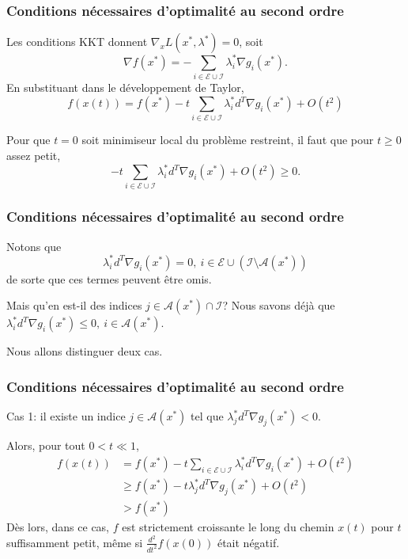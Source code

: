 \documentclass[usepdftitle=false,aspectratio=169]{beamer}
\def\cA{\mathcal{A}}
\def\cE{\mathcal{E}}
\def\cI{\mathcal{I}}
\begin{document}
\begin{frame}
\frametitle{Conditions nécessaires d'optimalité au second ordre}

Les conditions KKT donnent $\nabla_x L(x^*,\lambda^*) = 0$, soit
$$
\nabla f(x^*) = -\sum_{i \in \cE \cup \cI} \lambda_i^* \nabla g_i(x^*).
$$
En substituant dans le développement de Taylor,
$$
f(x(t)) = f(x^*) - t \sum_{i \in \cE \cup \cI} \lambda_i^* d^T \nabla g_i(x^*) + O(t^2)
$$

\mbox{}

Pour que $t = 0$ soit minimiseur local du problème restreint, il faut que pour $t \geq 0$ assez petit,
$$
- t \sum_{i \in \cE \cup \cI} \lambda_i^* d^T \nabla g_i(x^*) + O(t^2) \geq 0.
$$

\end{frame}

\begin{frame}
\frametitle{Conditions nécessaires d'optimalité au second ordre}

Notons que
$$
\lambda_i^* d^T\nabla g_i(x^*) = 0,\ i \in \cE \cup (\cI \setminus \cA(x^*))
$$
de sorte que ces termes peuvent être omis.

\mbox{}

Mais qu'en est-il des indices $j \in \cA(x^*) \cap \cI$?
Nous savons déjà que $\lambda_i^* d^T\nabla g_i(x^*) \leq 0,\ i \in \cA(x^*)$.


Nous allons distinguer deux cas.

\end{frame}

\begin{frame}
\frametitle{Conditions nécessaires d'optimalité au second ordre}

Cas 1: il existe un indice $j \in \cA(x^*)$ tel que $\lambda_j^* d^T \nabla g_j(x^*) < 0$.

\mbox{}

Alors, pour tout $0 < t \ll 1$,
\begin{align*}
f(x(t))
&= f(x^*) - t \sum_{i \in \cE \cup \cI} \lambda_i^* d^T \nabla g_i(x^*) + O(t^2) \\
&\geq f(x^*) - t \lambda_j^* d^T \nabla g_j(x^*) + O(t^2) \\
&> f(x^*)
\end{align*}
Dès lors, dans ce cas, $f$ est strictement croissante le long du chemin $x(t)$ pour $t$ suffisamment petit, même si $\frac{d^2}{dt^2} f(x(0))$ était négatif.

\end{frame}
\end{document}

